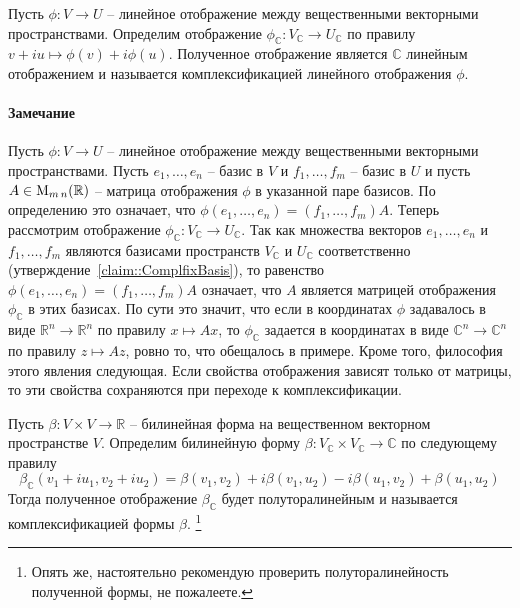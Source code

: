 \begin{definition}
Пусть $\phi\colon V\to U$ -- линейное отображение между вещественными векторными пространствами.
Определим отображение $\phi_\mathbb C\colon V_\mathbb C\to U_\mathbb C$ по правилу $v+iu \mapsto \phi(v) + i\phi(u)$.
Полученное отображение является $\mathbb C$ линейным отображением и называется комплексификацией линейного отображения $\phi$.
\end{definition}

\paragraph{Замечание}

Пусть $\phi\colon V\to U$ -- линейное  отображение между вещественными векторными пространствами.
Пусть $e_1,\ldots,e_n$ -- базис в $V$ и $f_1,\ldots,f_m$ -- базис в $U$ и пусть $A\in \operatorname{M}_{m\,n}(\mathbb R)$ -- матрица отображения $\phi$ в указанной паре базисов.
По определению это означает, что $\phi(e_1,\ldots,e_n) = (f_1,\ldots,f_m)A$.
Теперь рассмотрим отображение $\phi_\mathbb C \colon V_\mathbb C\to U_\mathbb C$.
Так как множества векторов $e_1,\ldots,e_n$ и $f_1,\ldots,f_m$ являются базисами пространств $V_\mathbb C$ и $U_\mathbb C$ соответственно (утверждение~\ref{claim::ComplfixBasis}), то равенство $\phi(e_1,\ldots,e_n) = (f_1,\ldots,f_m)A$ означает, что $A$ является матрицей отображения $\phi_\mathbb C$ в этих базисах.
По сути это значит, что если в координатах $\phi$ задавалось в виде $\mathbb R^n \to \mathbb R^n$ по правилу $x \mapsto Ax$, то $\phi_\mathbb C$ задается в координатах в виде $\mathbb C^n \to \mathbb C^n$ по правилу $z\mapsto Az$, ровно то, что обещалось в примере.
Кроме того, философия этого явления следующая.
Если свойства отображения зависят только от матрицы, то эти свойства сохраняются при переходе к комплексификации.

\begin{definition}
\label{definition::ComplfixBil}
Пусть $\beta\colon V\times V\to \mathbb R$ -- билинейная форма на вещественном векторном пространстве $V$.
Определим билинейную форму $\beta \colon V_\mathbb C\times V_\mathbb C\to \mathbb C$ по следующему правилу
\[
\beta_\mathbb C(v_1+iu_1, v_2 + iu_2) = \beta(v_1, v_2) + i\beta(v_1,u_2) - i\beta(u_1, v_2) + \beta(u_1, u_2)
\]
Тогда полученное отображение $\beta_\mathbb C$ будет полуторалинейным и называется комплексификацией формы $\beta$.%
\footnote{Опять же, настоятельно рекомендую проверить полуторалинейность полученной формы, не пожалеете.}
\end{definition}


